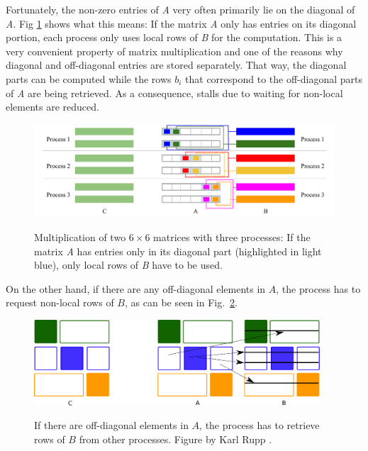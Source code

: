 Fortunately, the non-zero entries of \textit{A} very often primarily lie on the diagonal of \textit{A}. Fig \ref{fig:matmult_diagonal} shows what this means: If the matrix \textit{A} only has entries on its diagonal portion, each process only uses local rows of \textit{B} for the computation. This is a very convenient property of matrix multiplication and one of the reasons why diagonal and off-diagonal entries are stored separately. That way, the diagonal parts can be computed while the rows $b_i$ that correspond to the off-diagonal parts of \textit{A} are being retrieved. As a consequence, stalls due to waiting for non-local elements are reduced. 

\begin{figure}[tb]
\centering
{\includegraphics[width=1.05\textwidth]{matrix_multiplication_diagonal}}
\caption{Multiplication of two $6\times 6$ matrices with three processes: If the matrix \textit{A} has entries only in its diagonal part (highlighted in light blue), only local rows of \textit{B} have to be used.}
\label{fig:matmult_diagonal}
\end{figure}

On the other hand, if there are any off-diagonal elements in $A$, the process has to request non-local rows of $B$, as can be seen in Fig.~\ref{fig:parallel-2}. 


\begin{figure}[tb]
\centering
\vspace{5mm}
{\includegraphics[width=0.95\textwidth]{parallel/spgemm-parallel-2}}
\caption{If there are off-diagonal elements in $A$, the process has to retrieve rows of $B$ from other processes. Figure by Karl Rupp \cite{karli_LANS_image}.}
\label{fig:parallel-2}
\end{figure}




